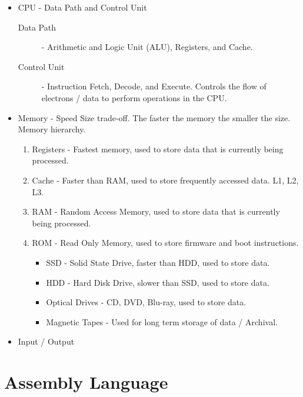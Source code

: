\documentclass[12pt letter]{report}
\begin{document}
\begin{itemize}
  \item CPU - Data Path and Control Unit
        \begin{description}
          \item[Data Path] - Arithmetic and Logic Unit (ALU), Registers, and Cache.
          \item[Control Unit] - Instruction Fetch, Decode, and Execute. Controls the flow of electrons / data to perform
                operations in the CPU.
        \end{description}
  \item Memory - Speed Size trade-off. The faster the memory the smaller the size. Memory hierarchy.
        \begin{enumerate}
          \item Registers - Fastest memory, used to store data that is currently being processed.
          \item Cache - Faster than RAM, used to store frequently accessed data. L1, L2, L3.
          \item RAM - Random Access Memory, used to store data that is currently being processed.
          \item ROM - Read Only Memory, used to store firmware and boot instructions.
                \begin{itemize}
                  \item SSD - Solid State Drive, faster than HDD, used to store data.
                  \item HDD - Hard Disk Drive, slower than SSD, used to store data.
                  \item Optical Drives - CD, DVD, Blu-ray, used to store data.
                  \item Magnetic Tapes - Used for long term storage of data / Archival.
                \end{itemize}
        \end{enumerate}
  \item Input / Output
\end{itemize}

\section{Assembly Language}

\end{document}
